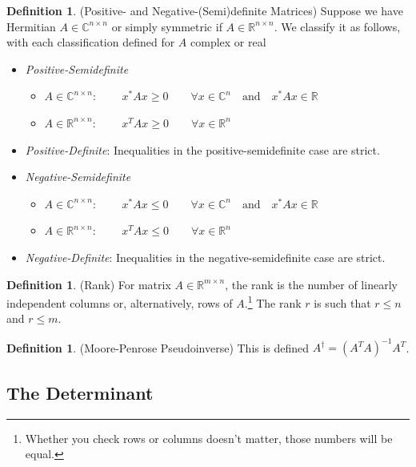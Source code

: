 \documentclass[12pt]{article}
\numberwithin{equation}{section} %
\theoremstyle{plain}
\theoremstyle{definition}
\newtheorem{defn}[thm]{Definition}
\theoremstyle{remark}
\newcommand{\R}{\mathbb{R}}
\newcommand{\C}{\mathbb{C}}
\begin{document}
\begin{defn}{(Positive- and Negative-(Semi)definite Matrices)}
Suppose we have Hermitian $A \in \C^{n\times n}$ or simply
symmetric if $A \in \R^{n\times n}$. We classify it as follows, with
each classification defined for $A$ complex or real
\begin{itemize}
  \item \emph{Positive-Semidefinite}
    \begin{itemize}
      \item $A \in \C^{n\times n}$:
          $\qquad x^* A x \geq 0
          \qquad \forall x\in \C^n
          \quad \text{and} \quad x^* A x\in \R$
      \item $A \in \R^{n\times n}$:
          $\qquad x^T A x\geq 0
          \qquad \forall x\in \R^n$
    \end{itemize}
  \item \emph{Positive-Definite}: Inequalities in the
    positive-semidefinite case are strict.
  \item \emph{Negative-Semidefinite}
    \begin{itemize}
      \item $A \in \C^{n\times n}$:
          $\qquad x^* A x \leq 0
          \qquad \forall x\in \C^n
          \quad \text{and} \quad x^* A x\in \R$
      \item $A \in \R^{n\times n}$:
          $\qquad x^T A x\leq 0
          \qquad \forall x\in \R^n$
    \end{itemize}
  \item \emph{Negative-Definite}: Inequalities in the
    negative-semidefinite case are strict.
\end{itemize}
\end{defn}

\begin{defn}{(Rank)}
For matrix $A\in \R^{m \times n}$, the rank is the number of linearly
independent columns or, alternatively, rows of $A$.\footnote{Whether you
check rows or columns doesn't matter, those numbers will be equal.} The
rank $r$ is such that $r \leq n$ and $r\leq m$.
\end{defn}

\begin{defn}(Moore-Penrose Pseudoinverse)
This is defined $A^\dagger = (A^TA)^{-1}A^T$.
\end{defn}

\subsection{The Determinant}
\end{document}
